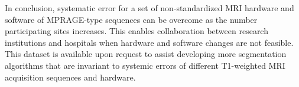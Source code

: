 In conclusion, systematic error for a set of non-standardized MRI hardware and software of MPRAGE-type sequences can be overcome as the number participating sites increases. This enables collaboration between research institutions and hospitals when hardware and software changes are not feasible. This dataset is available upon request to assist developing more segmentation algorithms that are invariant to systemic errors of different T1-weighted MRI acquisition sequences and hardware.